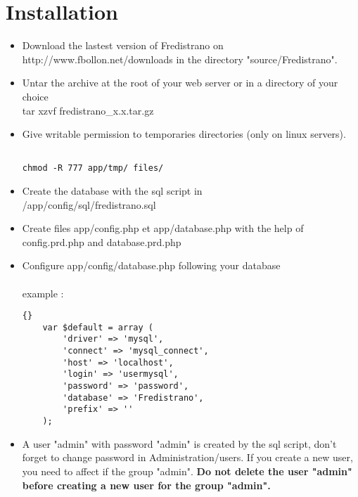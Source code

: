 \documentclass[12pt,a4paper]{report}
\begin{document}
\chapter{Installation}
\begin{itemize}
\item Download the lastest version of Fredistrano on http://www.fbollon.net/downloads in the directory "source/Fredistrano".\\
\item Untar the archive at the root of your web server or in a directory of your choice \: \\
tar xzvf fredistrano\_x.x.tar.gz \\
\item Give writable permission to temporaries directories (only on linux servers).\\
\begin{verbatim}

chmod -R 777 app/tmp/ files/

\end{verbatim}

\item Create the database with the sql script in\\ /app/config/sql/fredistrano.sql\\
\item Create files app/config.php et app/database.php with the help of config.prd.php and database.prd.php\newpage

\item Configure app/config/database.php following your database\\\\example :\\

\lstset{language=Php}
\lstset{commentstyle=\textit}

\begin{lstlisting}[frame=tb]{}
	var $default = array (
		'driver' => 'mysql',
		'connect' => 'mysql_connect',
		'host' => 'localhost',
		'login' => 'usermysql',
		'password' => 'password',
		'database' => 'Fredistrano',
		'prefix' => ''
	);
\end{lstlisting}


\item A user "admin" with password "admin" is created by the sql script, don't forget to change password in Administration/users.
If you create a new user, you need to affect if the group "admin".
\textbf{Do not delete the user "admin" before creating a new user for the group "admin".}

\end{itemize}
\end{document}

